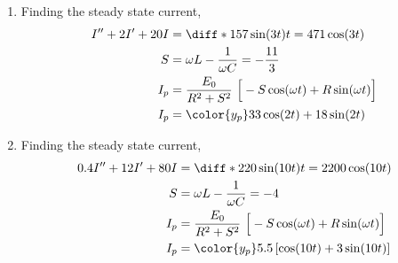 \begin{enumerate}
    \item Finding the steady state current,
          \begin{align}
              I'' + 2I' + 20I & = \diff* {157\sin(3t)}{t} = 471\cos(3t)         \\
              S               & = \omega L - \frac{1}{\omega C} = -\frac{11}{3} \\
              I_{p}           & = \frac{E_{0}}{R^{2} + S^{2}}
              \ \Big[-S\cos(\omega t) + R\sin(\omega t)\Big]                    \\
              I_{p}           & = {\color{y_p} 33\cos(2t) + 18\sin(2t)}         \\
          \end{align}

    \item Finding the steady state current,
          \begin{align}
              0.4I'' + 12I' + 80I & = \diff* {220\sin(10t)}{t} = 2200\cos(10t) \\
              S                   & = \omega L - \frac{1}{\omega C} = -4       \\
              I_{p}               & = \frac{E_{0}}{R^{2} + S^{2}}
              \ \Big[-S\cos(\omega t) + R\sin(\omega t)\Big]                   \\
              I_{p}               & = {\color{y_p} 5.5 \left[ \cos(10t)
              + 3\sin(10t) \right]}                                            \\
          \end{align}


\end{enumerate}
